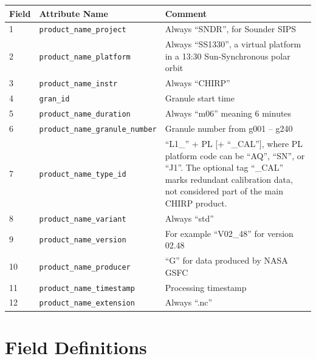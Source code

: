 \documentclass[11pt]{article}
\begin{document}
{\footnotesize
\begin{center}
\begin{tabular}{|m{7mm}|m{5.5cm}|m{8cm}| }
  \hline
  Field & Attribute Name & Comment \\
  \hline\hline
   1 & \texttt{product\_name\_project} & Always ``SNDR'', for Sounder
   SIPS \\
   \hline
   2 & \texttt{product\_name\_platform} & Always ``SS1330'', a virtual
   platform in a 13:30 Sun-Synchronous polar orbit\\
   \hline
   3 & \texttt{product\_name\_instr} & Always “CHIRP” \\
   \hline
   4 & \texttt{gran\_id} & Granule start time \\
   \hline
   5 & \texttt{product\_name\_duration} & Always ``m06'' meaning 6
   minutes \\
   \hline
   6 & \texttt{product\_name\_granule\_number} & Granule number from
   g001 – g240 \\
   \hline
   7 & \texttt{product\_name\_type\_id} & ``L1\_'' + PL [+
     ``\_CAL''], where PL platform code can be ``AQ'', ``SN'', or
   ``J1''.  The optional tag ``\_CAL'' marks redundant calibration
   data, not considered part of the main CHIRP product. \\
   \hline
   8 & \texttt{product\_name\_variant} & Always ``std''\\
   \hline
   9 & \texttt{product\_name\_version} & For example ``V02\_48'' for
   version 02.48 \\
   \hline
   10 & \texttt{product\_name\_producer} & ``G'' for data produced by NASA GSFC\\
   \hline
   11 & \texttt{product\_name\_timestamp} & Processing timestamp \\
   \hline
   12 & \texttt{product\_name\_extension} & Always ``.nc'' \\
   \hline
\end{tabular}
\end{center}
}


\section{Field Definitions}
\label{fields}
{\footnotesize

}
{\scriptsize


}
\end{document}

